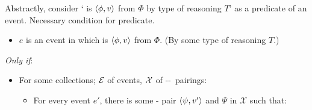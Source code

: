 \begin{note}
  Abstractly, consider `\vAgent{} is \emph{\tCV{}} \(\langle \phi, v \rangle\) from \(\Phi\) by type of reasoning \(T\)' as a predicate of an event.
  Necessary condition for predicate.

  \begin{idea}[\tCN{2}]
    \label{idea:tC}

    \begin{itemize}
    \item
      \(e\) is an event in which \vAgent{} is \emph{\tCV{}} \(\langle \phi, v \rangle\) from \(\Phi\).\newline
      \hfill(By some type of reasoning \(T\).)
    \end{itemize}

    \emph{Only if}:

    \begin{itemize}
    \item
      For some collections; \({\cal E}\) of events, \({\cal X}\) of --~pairings:
      \begin{itemize}
      \item
        For every event \(e'\), there is some -\val{} pair \(\langle \psi, v' \rangle\) and  \(\Psi\) in \(\mathcal{X}\) such that:
      \end{itemize}
    \end{itemize}
    \vspace{-\baselineskip}
  \end{idea}


\end{note}
